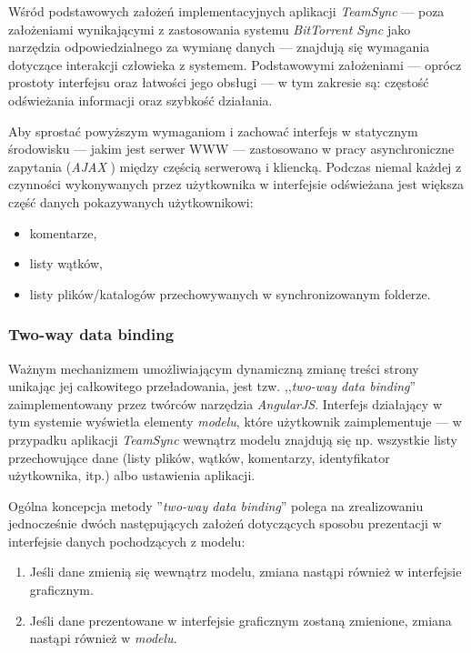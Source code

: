 \documentclass[polish,a4paper,twoside]{ppfcmthesis}
\begin{document}
Wśród podstawowych założeń implementacyjnych aplikacji \emph{TeamSync} --- poza założeniami wynikającymi z zastosowania systemu \emph{BitTorrent Sync} jako narzędzia odpowiedzialnego za wymianę danych --- znajdują się wymagania dotyczące interakcji człowieka z systemem. Podstawowymi założeniami --- oprócz prostoty interfejsu oraz łatwości jego obsługi --- w tym zakresie są: częstość odświeżania informacji oraz szybkość działania.

Aby sprostać powyższym wymaganiom i zachować interfejs w statycznym środowisku --- jakim jest serwer WWW --- zastosowano w pracy asynchroniczne zapytania (\emph{AJAX} \cite{ajax}) między częścią serwerową i kliencką. Podczas niemal każdej z czynności wykonywanych przez użytkownika w interfejsie odświeżana jest większa część danych pokazywanych użytkownikowi:

\begin{itemize}[noitemsep]
  \item komentarze,
  \item listy wątków,
  \item listy plików/katalogów przechowywanych w synchronizowanym folderze.
\end{itemize}

\subsubsection*{Two-way data binding}

Ważnym mechanizmem umożliwiającym dynamiczną zmianę treści strony unikając jej całkowitego przeładowania, jest tzw. ,,\emph{two-way data binding}'' zaimplementowany przez twórców narzędzia \emph{AngularJS}. Interfejs działający w tym systemie wyświetla elementy \emph{modelu}, które użytkownik zaimplementuje --- w przypadku aplikacji \emph{TeamSync} wewnątrz modelu znajdują się np. wszystkie listy przechowujące dane (listy plików, wątków, komentarzy, identyfikator użytkownika, itp.) albo ustawienia aplikacji.

Ogólna koncepcja metody ''\emph{two-way data binding}'' polega na zrealizowaniu jednocześnie dwóch następujących założeń dotyczących sposobu prezentacji w interfejsie danych pochodzących z modelu:

\begin{enumerate}[noitemsep]
  \item Jeśli dane zmienią się wewnątrz modelu, zmiana nastąpi również w interfejsie graficznym.
  
  \item Jeśli dane prezentowane w interfejsie graficznym zostaną zmienione, zmiana nastąpi również w \emph{modelu}.
\end{enumerate}
\end{document}

